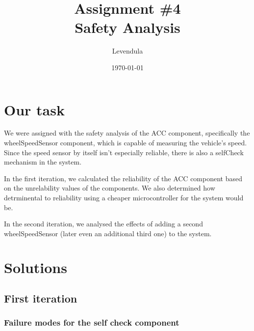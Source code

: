 \documentclass[a4paper]{article}
\title{Assignment \#4 \\ Safety Analysis}
\author{Levendula}
\date{\today}
\begin{document}


\tableofcontents
\listoffigures
\listoftables
\clearpage



\section{Our task}

We were assigned with the safety analysis of the \gls{ACC} component,
specifically the \gls{wheelSpeedSensor} component, which is capable of measuring
the vehicle's speed. Since the speed sensor by itself isn't especially reliable,
there is also a \gls{selfCheck} mechanism in the system.

In the first iteration, we calculated the reliability of the \gls{ACC} component
based on the unrelability values of the components. We also determined how
detrminental to reliability using a cheaper microcontroller for the system would
be.

In the second iteration, we analysed the effects of adding a second
\gls{wheelSpeedSensor} (later even an additional third one) to the system.



\section{Solutions}


\subsection{First iteration}

\subsubsection{Failure modes for the self check component}\label{ssub:failmodes}
\end{document}
